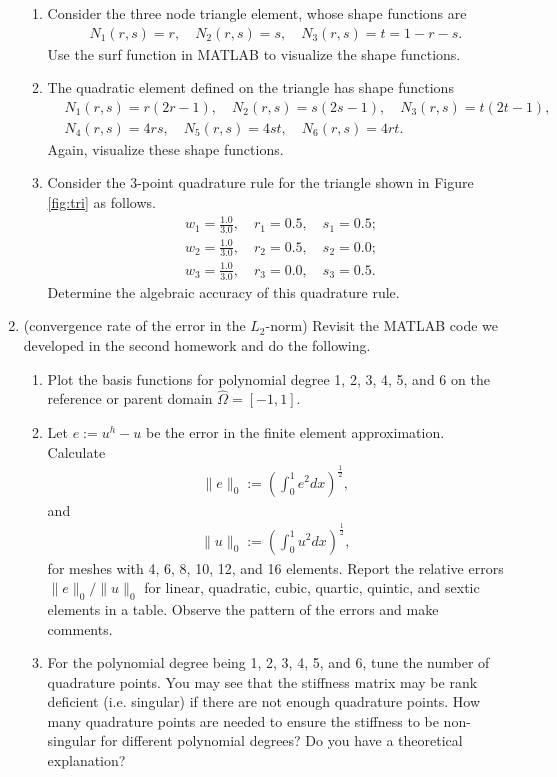 \documentclass[12pt]{article}
\begin{document}
\begin{enumerate}
\begin{enumerate}
\item Consider the three node triangle element, whose shape functions are 
\begin{align*}
N_1(r,s) = r, \quad N_2(r,s) = s, \quad N_3(r,s) = t = 1 - r - s.
\end{align*}
Use the surf function in MATLAB to visualize the shape functions.

\item The quadratic element defined on the triangle has shape functions
\begin{align*}
& N_1(r,s) = r(2r-1), \quad N_2(r,s) = s(2s-1), \quad N_3(r,s) = t(2t-1), \\
& N_4(r,s) = 4rs, \quad N_5(r,s) = 4st, \quad N_6(r,s) = 4rt.
\end{align*}
Again, visualize these shape functions.

\item Consider the 3-point quadrature rule for the triangle shown in Figure \ref{fig:tri} as follows.
\begin{align*}
&w_1 = \frac{1.0}{3.0}, \quad r_1 = 0.5, \quad s_1 = 0.5; \\
&w_2= \frac{1.0}{3.0}, \quad r_2 = 0.5, \quad s_2 = 0.0;\\
&w_3 = \frac{1.0}{3.0}, \quad r_3 = 0.0, \quad s_3 = 0.5.
\end{align*}
Determine the algebraic accuracy of this quadrature rule.
\end{enumerate}



\item (convergence rate of the error in the $L_2$-norm) Revisit the MATLAB code we developed in the second homework and do the following.
\begin{enumerate}
\item Plot the basis functions for polynomial degree 1, 2, 3, 4, 5, and 6 on the reference or parent domain $\hat{\Omega}=[-1,1]$.
\item Let $e:=u^h - u$ be the error in the finite element approximation. Calculate
\begin{align*}
\|e\|_0 := \left( \int_0^1  e^2 dx \right)^{\frac12},
\end{align*}
and 
\begin{align*}
\|u\|_0 := \left( \int_0^1  u^2 dx \right)^{\frac12},
\end{align*}
for meshes with 4, 6, 8, 10, 12, and 16 elements. Report the relative errors $\|e\|_0/\|u\|_0$ for linear, quadratic, cubic, quartic, quintic, and sextic elements in a table. Observe the pattern of the errors and make comments.
\item For the polynomial degree being 1, 2, 3, 4, 5, and 6, tune the number of quadrature points. You may see that the stiffness matrix may be rank deficient (i.e. singular) if there are not enough quadrature points. How many quadrature points are needed to ensure the stiffness to be non-singular for different polynomial degrees? Do you have a theoretical explanation?
\end{enumerate}
\end{enumerate}
\end{document}
